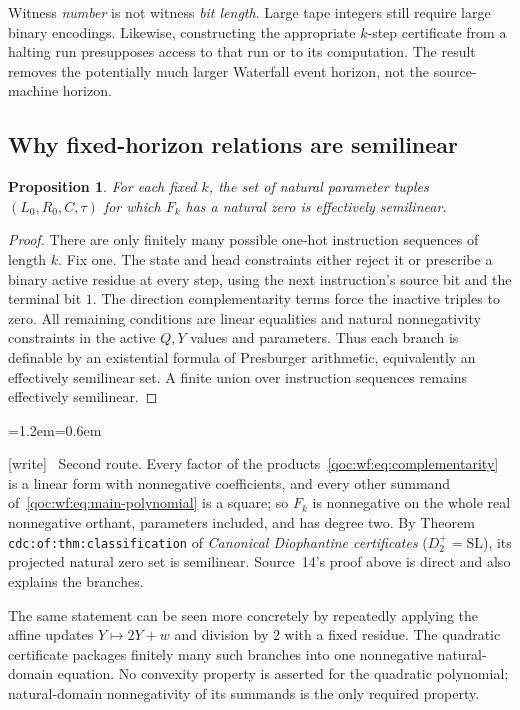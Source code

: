 \documentclass[11pt,letterpaper]{article}
\newtheorem{proposition}[theorem]{Proposition}
\theoremstyle{definition}
\theoremstyle{remark}
\newcommand{\wtag}{\textup{[write]}}
\newenvironment{writenote}{\par\smallskip\begin{list}{}{\leftmargin=1.2em\rightmargin=0.6em}\item[]\small\wtag\ }{\end{list}\smallskip}
\newcommand{\lab}[1]{\nolinkurl{#1}}
\newcommand{\Dplus}{D^{+}}
\begin{document}
Witness \emph{number} is not witness \emph{bit length}. Large tape integers still require large binary encodings. Likewise, constructing the appropriate $k$-step certificate from a halting run presupposes access to that run or to its computation. The result removes the potentially much larger Waterfall event horizon, not the source-machine horizon.

\subsection{Why fixed-horizon relations are semilinear}
\begin{proposition}\label{qoc:wf:prop:semilinear}
For each fixed $k$, the set of natural parameter tuples $(L_0,R_0,C,\tau)$ for which $F_k$ has a natural zero is effectively semilinear.
\end{proposition}
\begin{proof}
There are only finitely many possible one-hot instruction sequences of length $k$. Fix one. The state and head constraints either reject it or prescribe a binary active residue at every step, using the next instruction's source bit and the terminal bit $1$. The direction complementarity terms force the inactive triples to zero. All remaining conditions are linear equalities and natural nonnegativity constraints in the active $Q,Y$ values and parameters. Thus each branch is definable by an existential formula of Presburger arithmetic, equivalently an effectively semilinear set. A finite union over instruction sequences remains effectively semilinear.
\end{proof}

\begin{writenote}
Second route. Every factor of the products~\eqref{qoc:wf:eq:complementarity} is a linear form with nonnegative coefficients, and every other summand of~\eqref{qoc:wf:eq:main-polynomial} is a square; so $F_k$ is nonnegative on the whole real nonnegative orthant, parameters included, and has degree two. By Theorem \lab{cdc:of:thm:classification} of \emph{Canonical Diophantine certificates} ($\Dplus_2=\mathrm{SL}$), its projected natural zero set is semilinear. Source~14's proof above is direct and also explains the branches.
\end{writenote}

The same statement can be seen more concretely by repeatedly applying the affine updates $Y\mapsto2Y+w$ and division by $2$ with a fixed residue. The quadratic certificate packages finitely many such branches into one nonnegative natural-domain equation. No convexity property is asserted for the quadratic polynomial; natural-domain nonnegativity of its summands is the only required property.
\end{document}
